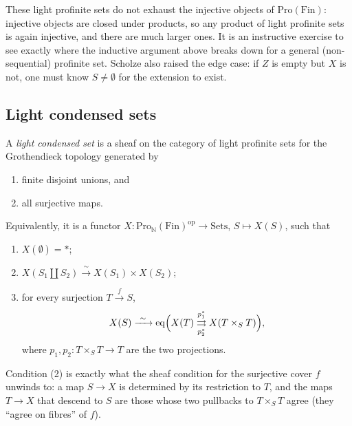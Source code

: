 \begin{remark}
\label{rmk:2:injective-more}
These light profinite sets do not exhaust the injective objects of
$\mathrm{Pro}(\mathrm{Fin})$: injective objects are closed under products, so any
product of light profinite sets is again injective, and there are much larger
ones. It is an instructive exercise to see exactly where the inductive argument
above breaks down for a general (non-sequential) profinite set. Scholze also
raised the edge case: if $Z$ is empty but $X$ is not, one must know $S\neq
\emptyset$ for the extension to exist.
\end{remark}

\subsection{Light condensed sets}

\begin{definition}
\label{def:2:light-condensed-set}
A \emph{light condensed set} is a sheaf on the category of light profinite sets
for the Grothendieck topology generated by
\begin{enumerate}
\item finite disjoint unions, and
\item all surjective maps.
\end{enumerate}
Equivalently, it is a functor
$X\colon\mathrm{Pro}_{\mathbb{N}}(\mathrm{Fin})^{\mathrm{op}}\to\mathrm{Sets}$,
$S\mapsto X(S)$, such that
\begin{enumerate}
\item[(0)] $X(\emptyset)=\ast$;
\item[(1)] $X(S_1\amalg S_2)\xrightarrow{\ \sim\ }X(S_1)\times X(S_2)$;
\item[(2)] for every surjection $T\xrightarrow{f}S$,
\begin{equation*}
X(S)\xrightarrow{\ \sim\ }\operatorname{eq}\Bigl(X(T)
\underset{p_2^{*}}{\overset{p_1^{*}}{\rightrightarrows}}
X(T\times_S T)\Bigr),
\end{equation*}
where $p_1,p_2\colon T\times_S T\to T$ are the two projections.
\end{enumerate}
\end{definition}

Condition (2) is exactly what the sheaf condition for the surjective cover $f$
unwinds to: a map $S\to X$ is determined by its restriction to $T$, and the maps
$T\to X$ that descend to $S$ are those whose two pullbacks to $T\times_S T$ agree
(they ``agree on fibres'' of $f$).

